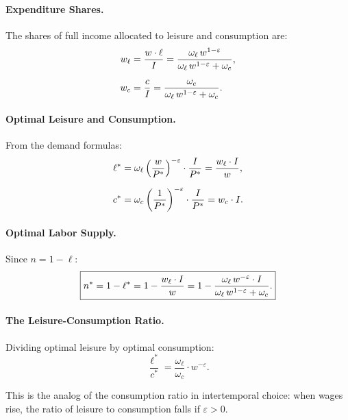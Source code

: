 \paragraph{Expenditure Shares.}
The shares of full income allocated to leisure and consumption are:
\begin{align}
w_\ell &= \frac{w \cdot \ell}{I} = \frac{\omega_\ell \, w^{1-\varepsilon}}{\omega_\ell \, w^{1-\varepsilon} + \omega_c}, \label{eq:share-leisure} \\[6pt]
w_c &= \frac{c}{I} = \frac{\omega_c}{\omega_\ell \, w^{1-\varepsilon} + \omega_c}. \label{eq:share-consumption}
\end{align}

\paragraph{Optimal Leisure and Consumption.}
From the demand formulas:
\begin{align}
\ell^* &= \omega_\ell \left( \frac{w}{P^{*}} \right)^{-\varepsilon} \cdot \frac{I}{P^{*}} = \frac{w_\ell \cdot I}{w}, \label{eq:leisure-star} \\[6pt]
c^* &= \omega_c \left( \frac{1}{P^{*}} \right)^{-\varepsilon} \cdot \frac{I}{P^{*}} = w_c \cdot I. \label{eq:consumption-star}
\end{align}

\paragraph{Optimal Labor Supply.}
Since $n = 1 - \ell$:
\begin{equation}
\boxed{n^* = 1 - \ell^* = 1 - \frac{w_\ell \cdot I}{w} = 1 - \frac{\omega_\ell \, w^{-\varepsilon} \cdot I}{\omega_\ell \, w^{1-\varepsilon} + \omega_c}.}
\label{eq:labor-star}
\end{equation}

\paragraph{The Leisure-Consumption Ratio.}
Dividing optimal leisure by optimal consumption:
\begin{equation}
\frac{\ell^*}{c^*} = \frac{\omega_\ell}{\omega_c} \cdot w^{-\varepsilon}.
\label{eq:leisure-consumption-ratio}
\end{equation}

This is the analog of the consumption ratio in intertemporal choice: when wages rise, the ratio of leisure to consumption falls if $\varepsilon > 0$.

